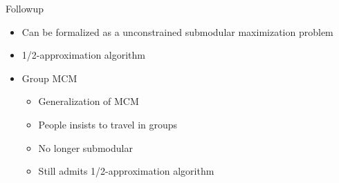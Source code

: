 \begin{frame}{Followup}
\begin{itemize}
	\item<1> Can be formalized as a unconstrained submodular maximization problem
	\item<2> 1/2-approximation algorithm
	\item<3-7> Group MCM
  	\begin{itemize}
    	\item<4> Generalization of MCM
    	\item<5> People insists to travel in groups
    	\item<6> No longer submodular
    	\item<7> Still admits 1/2-approximation algorithm 
	\end{itemize}   
\end{itemize}
\end{frame}